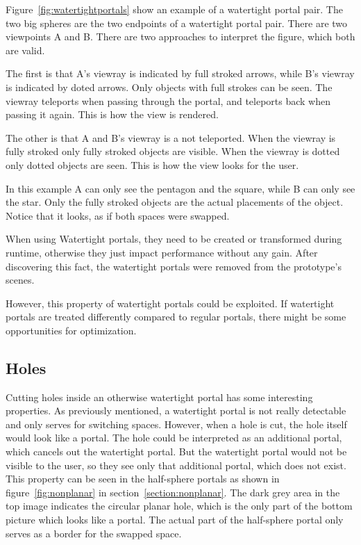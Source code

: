 Figure~\ref{fig:watertightportals} show an example of a watertight portal pair. The two big spheres are the two endpoints of a watertight portal pair. There are two viewpoints A and B.
There are two approaches to interpret the figure, which both are valid.

The first is that A's \gls{viewray} is indicated by full stroked arrows, while B's \gls{viewray} is indicated by doted arrows. Only objects with full strokes can be seen. The \gls{viewray} teleports when passing through the portal, and teleports back when passing it again. This is how the view is rendered.

The other is that A and B's \gls{viewray} is a not teleported. When the \gls{viewray} is fully stroked only fully stroked objects are visible. When the \gls{viewray} is dotted only dotted objects are seen. This is how the view looks for the user.

In this example A can only see the pentagon and the square, while B can only see the star. Only the fully stroked objects are the actual placements of the object. Notice that it looks, as if both spaces were swapped.

When using Watertight portals, they need to be created or transformed during runtime, otherwise they just impact performance without any gain. After discovering this fact, the watertight portals were removed from the prototype's scenes.

However, this property of watertight portals could be exploited. If watertight portals are treated differently compared to regular portals, there might be some opportunities for optimization.

\subsection{Holes}
Cutting holes inside an otherwise watertight portal has some interesting properties. As previously mentioned, a watertight portal is not really detectable and only serves for switching spaces. However, when a hole is cut, the hole itself would look like a portal. The hole could be interpreted as an additional portal, which cancels out the watertight portal. But the watertight portal would not be visible to the user, so they see only that additional portal, which does not exist. This property can be seen in the half-sphere portals as shown in figure~\ref{fig:nonplanar} in section~\ref{section:nonplanar}. The dark grey area in the top image indicates the circular planar hole, which is the only part of the bottom picture which looks like a portal. The actual part of the half-sphere portal only serves as a border for the swapped space.
